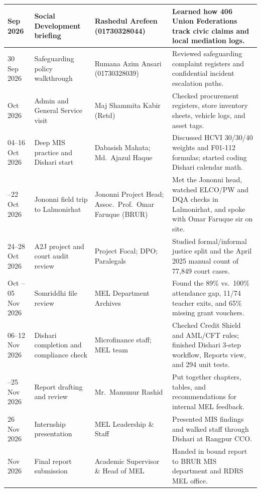 \documentclass[12pt,a4paper]{report}
\begin{document}
{\begin{longtable}{|>{\raggedright\arraybackslash}p{1.8cm}|>{\raggedright\arraybackslash}p{3.8cm}|>{\raggedright\arraybackslash}p{3.6cm}|>{\raggedright\arraybackslash}p{5.0cm}|}
29 Sep 2026 & Social Development briefing & Rashedul Arefeen (01730328044) & Learned how 406 Union Federations track civic claims and local mediation logs. \\ \hline
\rowcolor{RDRSLight} 30 Sep 2026 & Safeguarding policy walkthrough & Rumana Azim Ansari (01730328039) & Reviewed safeguarding complaint registers and confidential incident escalation paths. \\ \hline
01 Oct 2026 & Admin and General Service visit & Maj Shammita Kabir (Retd) & Checked procurement registers, store inventory sheets, vehicle logs, and asset tags. \\ \hline
\rowcolor{RDRSLight} 04--16 Oct 2026 & Deep MIS practice and Dishari start & Dabasish Mahata; Md.~Ajazul Haque & Discussed HCVI 30/30/40 weights and F01-112 formulas; started coding Dishari calendar math. \\ \hline
18--22 Oct 2026 & Jononni field trip to Lalmonirhat & Jononni Project Head; Assoc.~Prof.~Omar Faruque (BRUR) & Met the Jononni head, watched ELCO/PW and DQA checks in Lalmonirhat, and spoke with Omar Faruque sir on site. \\ \hline
\rowcolor{RDRSLight} 24--28 Oct 2026 & A2J project and court audit review & Project Focal; DPO; Paralegals & Studied formal/informal justice split and the April 2025 manual count of 77,849 court cases. \\ \hline
29 Oct -- 05 Nov 2026 & Somriddhi file review & MEL Department Archives & Found the 89\% vs.\ 100\% attendance gap, 11/74 teacher exits, and 65\% missing grant vouchers. \\ \hline
\rowcolor{RDRSLight} 06--12 Nov 2026 & Dishari completion and compliance check & Microfinance staff; MEL team & Checked Credit Shield and AML/CFT rules; finished Dishari 3-step workflow, Reports view, and 294 unit tests. \\ \hline
15--25 Nov 2026 & Report drafting and review & Mr.~Mamunur Rashid & Put together chapters, tables, and recommendations for internal MEL feedback. \\ \hline
\rowcolor{RDRSLight} 26 Nov 2026 & Internship presentation & MEL Leadership \& Staff & Presented MIS findings and walked staff through Dishari at Rangpur CCO. \\ \hline
30 Nov 2026 & Final report submission & Academic Supervisor \& Head of MEL & Handed in bound report to BRUR MIS department and RDRS MEL office. \\ \hline
\end{longtable}
}
\end{document}
